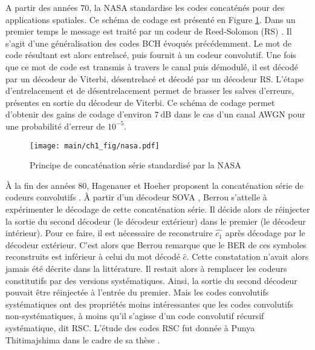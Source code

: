 A partir des années 70, la NASA standardise les codes concaténés pour des applications spatiales. Ce schéma de codage 
est présenté en Figure \ref{fig:nasa}. Dans un premier temps le message est traité par un codeur de Reed-Solomon (RS) \cite{RS}. 
Il s'agit d'une généralisation des codes BCH évoqués précédemment. Le mot de code résultant est alors entrelacé, puis fournit à un 
codeur convolutif. Une fois que ce mot de code est transmis à travers le canal puis démodulé, il est décodé par un 
décodeur de Viterbi, désentrelacé et décodé par un décodeur RS. L'étape d'entrelacement et de désentrelacement 
permet de brasser les salves d'erreurs, présentes en sortie du décodeur de Viterbi. Ce schéma de codage permet d'obtenir 
des gains de codage d'environ $7~\text{dB}$ dans le cas d'un canal AWGN pour une probabilité d'erreur de $10^{-5}$.
\begin{figure}[!h]
	\centering
	\texttt{[image: main/ch1\_fig/nasa.pdf]}
	\caption{\label{fig:nasa} Principe de concaténation série standardisé par la NASA}
\end{figure}

À la fin des années 80, Hagenauer et Hoeher proposent la concaténation série de codeurs convolutifs \cite{hagenauerConcatenated}.
À partir d'un décodeur SOVA \cite{BerrouHardwareSOVA}, Berrou s’attelle à expérimenter le décodage de cette 
concaténation série. Il décide alors de réinjecter la sortie du second décodeur (le décodeur extérieur) dans le premier
(le décodeur intérieur). Pour ce faire, il est nécessaire de reconstruire $\hat{c_1}$ après décodage par le décodeur extérieur.
C'est alors que Berrou remarque que le BER de ces symboles reconstruits est inférieur à celui du mot décodé $\hat{c}$. 
Cette constatation n'avait alors jamais été décrite dans la littérature. Il restait alors à remplacer les codeurs constitutifs 
par des versions systématiques. Ainsi, la sortie du second décodeur pouvait être réinjectée à l'entrée du premier.
Mais les codes convolutifs systématiques ont des propriétés moins intéressantes que les codes convolutifs non-systématiques, 
à moins qu'il s’agisse d'un code convolutif récursif systématique, dit RSC. L'étude des codes RSC fut donnée à Punya Thitimajshima
dans le cadre de sa thèse \cite{rscTheseTelecom}.

